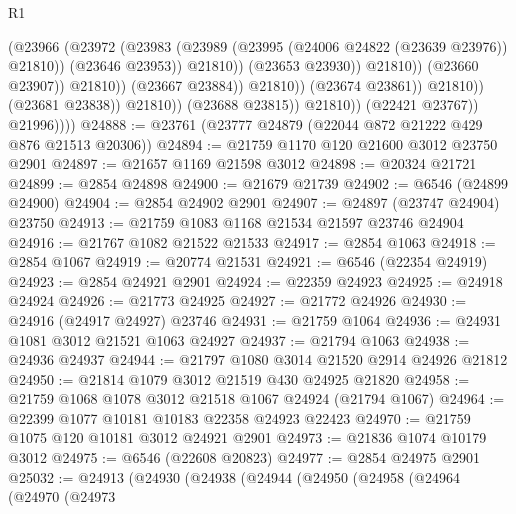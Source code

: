 \begin{lexlean}{R1}
\begin{coremodule}
                                                  (@23966
                                                    (@23972
                                                      (@23983
                                                        (@23989
                                                          (@23995
                                                            (@24006 @24822 (@23639 @23976))
                                                            @21810))
                                                        (@23646 @23953))
                                                      @21810))
                                                  (@23653 @23930))
                                                @21810))
                                            (@23660 @23907))
                                          @21810))
                                      (@23667 @23884))
                                    @21810))
                                (@23674 @23861))
                              @21810))
                          (@23681 @23838))
                        @21810))
                    (@23688 @23815))
                  @21810))
              (@22421 @23767))
            @21996))))
@24888 := @23761 (@23777 @24879 (@22044 @872 @21222 @429 @876 @21513 @20306))
@24894 := @21759 @1170 @120 @21600 @3012 @23750 @2901
@24897 := @21657 @1169 @21598 @3012
@24898 := @20324 @21721
@24899 := @2854 @24898
@24900 := @21679 @21739
@24902 := @6546 (@24899 @24900)
@24904 := @2854 @24902 @2901
@24907 := @24897 (@23747 @24904) @23750
@24913 := @21759 @1083 @1168 @21534 @21597 @23746 @24904
@24916 := @21767 @1082 @21522 @21533
@24917 := @2854 @1063
@24918 := @2854 @1067
@24919 := @20774 @21531
@24921 := @6546 (@22354 @24919)
@24923 := @2854 @24921 @2901
@24924 := @22359 @24923
@24925 := @24918 @24924
@24926 := @21773 @24925
@24927 := @21772 @24926
@24930 := @24916 (@24917 @24927) @23746
@24931 := @21759 @1064
@24936 := @24931 @1081 @3012 @21521 @1063 @24927
@24937 := @21794 @1063
@24938 := @24936 @24937
@24944 := @21797 @1080 @3014 @21520 @2914 @24926 @21812
@24950 := @21814 @1079 @3012 @21519 @430 @24925 @21820
@24958 := @21759 @1068 @1078 @3012 @21518 @1067 @24924 (@21794 @1067)
@24964 := @22399 @1077 @10181 @10183 @22358 @24923 @22423
@24970 := @21759 @1075 @120 @10181 @3012 @24921 @2901
@24973 := @21836 @1074 @10179 @3012
@24975 := @6546 (@22608 @20823)
@24977 := @2854 @24975 @2901
@25032 := @24913
    (@24930
      (@24938
        (@24944
          (@24950
            (@24958
              (@24964
                (@24970
                  (@24973

\end{coremodule}
\end{lexlean}
